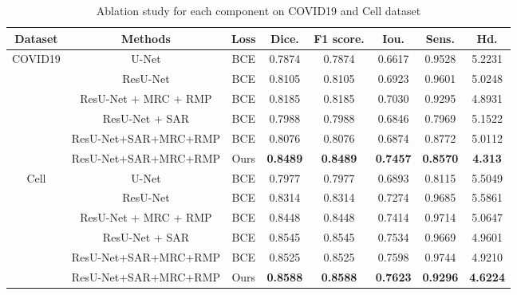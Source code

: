 \documentclass[UTF8]{article} %
\begin{document}
  \begin{table}[htbp]
    \vspace{-2mm}
    \begin{center}\small
    \label{ablation-table}
    \begin{tabular}{cccccccc}
      
    \toprule
    Dataset & Methods & Loss & Dice. & F1 score. & Iou. & Sens. & Hd.\\
    \midrule
    \multirow{6}{*}{COVID19} & U-Net                & BCE  & 0.7874          & 0.7874          & 0.6617          & 0.9528          & 5.2231        \\
                             & ResU-Net             & BCE  & 0.8105          & 0.8105          & 0.6923          & 0.9601          & 5.0248        \\
                               & ResU-Net + MRC + RMP & BCE  & 0.8185          & 0.8185          & 0.7030          & 0.9295          & 4.8931        \\
                               & ResU-Net + SAR       & BCE  & 0.7988          & 0.7988          & 0.6846          & 0.7969          & 5.1522        \\  %
                               & ResU-Net+SAR+MRC+RMP & BCE  & 0.8076          & 0.8076          & 0.6874          & 0.8772          & 5.0112        \\
                               & ResU-Net+SAR+MRC+RMP & Ours & \textbf{0.8489} & \textbf{0.8489} & \textbf{0.7457} & \textbf{0.8570} & \textbf{4.313}\\
    \hline
    \multirow{6}{*}{Cell} & U-Net                & BCE & 0.7977 & 0.7977 & 0.6893 & 0.8115 & 5.5049\\
                               & ResU-Net             & BCE & 0.8314 & 0.8314 & 0.7274 & 0.9685 & 5.5861\\
                               & ResU-Net + MRC + RMP & BCE & 0.8448 & 0.8448 & 0.7414 & 0.9714 & 5.0647\\
                               & ResU-Net + SAR       & BCE & 0.8545 & 0.8545 & 0.7534 & 0.9669 & 4.9601\\
                               & ResU-Net+SAR+MRC+RMP & BCE & 0.8525 & 0.8525 & 0.7598 & 0.9744 & 4.9210\\
                               & ResU-Net+SAR+MRC+RMP & Ours & \textbf{0.8588} & \textbf{0.8588} & \textbf{0.7623} & \textbf{0.9296} & \textbf{4.6224}\\
  \bottomrule    
    \end{tabular}
    \caption{Ablation study for each component on COVID19 and Cell dataset}
  \end{center}
    \vspace{-4mm}
  \end{table}
\end{document}
